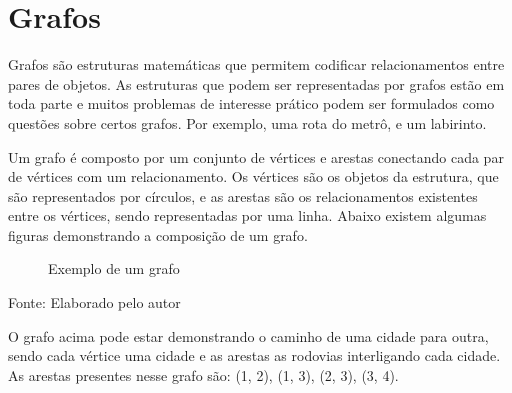 \section{Grafos}
Grafos são estruturas matemáticas que permitem codificar relacionamentos entre pares de objetos. As estruturas que podem ser representadas por grafos estão em toda parte e muitos problemas de interesse prático podem ser formulados como questões sobre certos grafos. Por exemplo, uma rota do metrô, e um labirinto.

Um grafo é composto por um conjunto de vértices e arestas conectando cada par de vértices com um relacionamento. Os vértices são os objetos da estrutura, que são representados por círculos, e as arestas são os relacionamentos existentes entre os vértices, sendo representadas por uma linha. Abaixo existem algumas figuras demonstrando a composição de um grafo.

\vspace{1cm}

\begin{figure}[!h]
    \centering
    \caption{Exemplo de um grafo}
\end{figure}
\begin{center}
    Fonte: Elaborado pelo autor
\end{center}

O grafo acima pode estar demonstrando o caminho de uma cidade para outra, sendo cada vértice uma cidade e as arestas as rodovias interligando cada cidade. As arestas presentes nesse grafo são: (1, 2), (1, 3), (2, 3), (3, 4).

\vspace{1cm}

